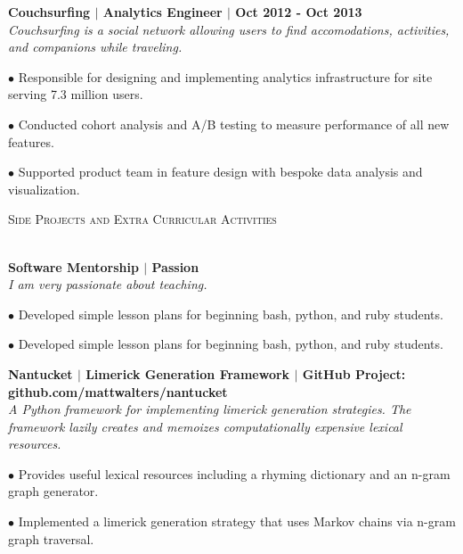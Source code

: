 \documentclass{article}
\newcommand{\lineunder}{\vspace*{-8pt} \\ \hspace*{-18pt} \hrulefill \\}
\newcommand{\header}[1]{{\hspace*{-15pt}\vspace*{6pt} \textsc{#1}} \vspace*{-6pt} \lineunder}
\begin{document}
\begin{description}
	 \item \textbf{Couchsurfing $|$ Analytics Engineer $|$ Oct 2012 - Oct 2013} \\
	  \textit{Couchsurfing is a social network allowing users to find accomodations, activities, and companions while traveling.}
	 \item$\bullet$ Responsible for designing and implementing analytics infrastructure for site serving 7.3 million users.
	 \item$\bullet$ Conducted cohort analysis and A/B testing to measure performance of all new features.
	 \item$\bullet$ Supported product team in feature design with bespoke data analysis and visualization.
	 
	 
	\end{description}

\header{Side Projects and Extra Curricular Activities}

\begin{description}
 \item \textbf{Software Mentorship $|$ Passion } \\

 \textit{I am very passionate about teaching. }  
 \item$\bullet$ Developed simple lesson plans for beginning bash, python, and ruby students.
 \item$\bullet$ Developed simple lesson plans for beginning bash, python, and ruby students.
 
 \item \textbf{Nantucket $|$ Limerick Generation Framework $|$ GitHub Project: github.com/mattwalters/nantucket } \\
 \textit{A Python framework for implementing limerick generation strategies. The framework lazily creates and memoizes computationally expensive lexical resources.}
 \item$\bullet$ Provides useful lexical resources including a rhyming dictionary and an n-gram graph generator.
 \item$\bullet$ Implemented a limerick generation strategy that uses Markov chains via n-gram graph traversal.
 
\end{description}
\end{document}
